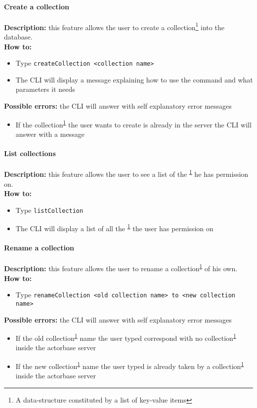 \documentclass{scalatekids-article}
\begin{document}
\paragraph{Create a collection}
\label{sec:createcollection}
\textbf{Description:} this feature allows the user to create a
collection\footnote{A data-structure constituted by a list of key-value items\label{coll}} into the database.\\
\textbf{How to:}
\begin{itemize}
\item Type \texttt{createCollection <collection name>}
\item The CLI will display a message explaining how to use the command and what parameters it needs
\end{itemize}
\textbf{Possible errors:} the CLI will answer with self explanatory error messages
\begin{itemize}
\item If the collection\textsuperscript{\ref{coll}} the user wants to create is already in the server the CLI will answer with a message
\end{itemize}

\paragraph{List collections}
\label{sec:listcollection}
\textbf{Description:} this feature allows the user to see a list of
the \textsuperscript{\ref{coll}} he has permission on.\\
\textbf{How to:}
\begin{itemize}
\item Type \texttt{listCollection}
\item The CLI will display a list of all the \textsuperscript{\ref{coll}} the user has
  permission on
\end{itemize}

\paragraph{Rename a collection}
\label{sec:renamecollection}
\textbf{Description:} this feature allows the user to rename a
collection\textsuperscript{\ref{coll}} of his own.\\
\textbf{How to:}
\begin{itemize}
\item Type \texttt{renameCollection <old collection name> to <new collection name>}
\end{itemize}
\textbf{Possible errors:} the CLI will answer with self explanatory error messages
\begin{itemize}
\item If the old collection\textsuperscript{\ref{coll}} name the user typed correspond with no collection\textsuperscript{\ref{coll}} inside the actorbase server
\item If the new collection\textsuperscript{\ref{coll}} name the user typed is already taken by a collection\textsuperscript{\ref{coll}} inside the actorbase server
\end{itemize}
\end{document}
